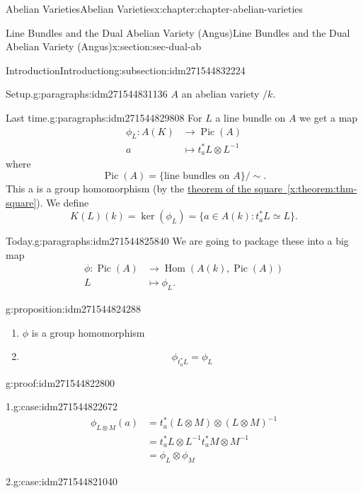 \documentclass[oneside,10pt,]{book}
\numberwithin{equation}{section}
\DeclareMathOperator{\Hom}{Hom}
\DeclareMathOperator{\Pic}{Pic}
\newcommand{\amp}{&}
\begin{document}
\begin{chapterptx}{Abelian Varieties}{}{Abelian Varieties}{}{}{x:chapter:chapter-abelian-varieties}
\begin{sectionptx}{Line Bundles and the Dual Abelian Variety (Angus)}{}{Line Bundles and the Dual Abelian Variety (Angus)}{}{}{x:section:sec-dual-ab}
\begin{subsectionptx}{Introduction}{}{Introduction}{}{}{g:subsection:idm271544832224}
\begin{paragraphs}{Setup.}{g:paragraphs:idm271544831136}
\(A\) an abelian variety \(/k\).%
\end{paragraphs}%
\begin{paragraphs}{Last time.}{g:paragraphs:idm271544829808}%
For \(L\) a line bundle on \(A\) we get a map%
\begin{align*}
\phi_L\colon A(K) \amp\to \Pic(A)\\
a\amp\mapsto t_a^* L\otimes L^{-1}
\end{align*}
where%
\begin{equation*}
\Pic(A) = \{\text{line bundles on } A\}/\sim\text{.}
\end{equation*}
This a is a group homomorphism (by the \hyperref[x:theorem:thm-square]{theorem of the square~\ref{x:theorem:thm-square}}). We define%
\begin{equation*}
K(L)(k) = \ker(\phi_L) = \{a\in A(k) : t_a^* L \simeq L\}\text{.}
\end{equation*}
%
\end{paragraphs}%
\begin{paragraphs}{Today.}{g:paragraphs:idm271544825840}%
We are going to package these into a big map%
\begin{align*}
\phi\colon \Pic(A)\amp\to \Hom(A(k), \Pic(A))\\
L \amp\mapsto \phi_L\text{.}
\end{align*}
%
\begin{proposition}{}{}{g:proposition:idm271544824288}%
%
\begin{enumerate}
\item{}\(\phi\) is a group homomorphism%
\item{}%
\begin{equation*}
\phi_{t_a^* L}  = \phi_L
\end{equation*}
%
\end{enumerate}
%
\end{proposition}
\begin{proofptx}{}{g:proof:idm271544822800}
\begin{case}{}{1.}{g:case:idm271544822672}
%
\begin{align*}
\phi_{L\otimes M}(a) \amp = t_a^*(L\otimes M) \otimes(L\otimes M)^{-1}\\
\amp = t_a^*L\otimes L^{-1} t_a^*M\otimes M^{-1}\\
\amp = \phi_L\otimes \phi_M
\end{align*}
%
\end{case}
\begin{case}{}{2.}{g:case:idm271544821040}
%
\begin{align*}

\end{align*}
\end{case}
\end{proofptx}
\end{paragraphs}
\end{subsectionptx}
\end{sectionptx}
\end{chapterptx}
\end{document}
